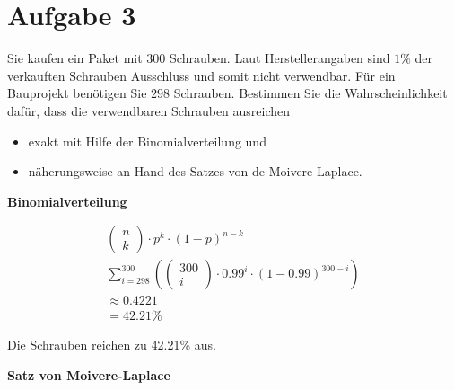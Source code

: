 \section{Aufgabe 3}

Sie kaufen ein Paket mit 300 Schrauben. Laut Herstellerangaben sind $1\%$ der
verkauften Schrauben Ausschluss und somit nicht verwendbar. Für ein Bauprojekt
benötigen Sie $298$ Schrauben. Bestimmen Sie die Wahrscheinlichkeit dafür, dass
die verwendbaren Schrauben ausreichen

\begin{itemize}
    \item exakt mit Hilfe der Binomialverteilung und
    \item näherungsweise an Hand des Satzes von de Moivere-Laplace.
\end{itemize}

\textbf{Binomialverteilung}

\begin{align*}
    \begin{pmatrix}
        n \\ k
    \end{pmatrix} \cdot p^k \cdot {(1 - p)}^{n - k}                                             \\
    \sum_{i = 298}^{300} \left(\begin{pmatrix}
                                   300 \\ i
                               \end{pmatrix} \cdot 0.99^{i} \cdot {(1 - 0.99)}^{300 - i}\right) \\
    \approx 0.4221                                                                              \\
    = 42.21\%
\end{align*}

Die Schrauben reichen zu 42.21\% aus.

\textbf{Satz von Moivere-Laplace}

